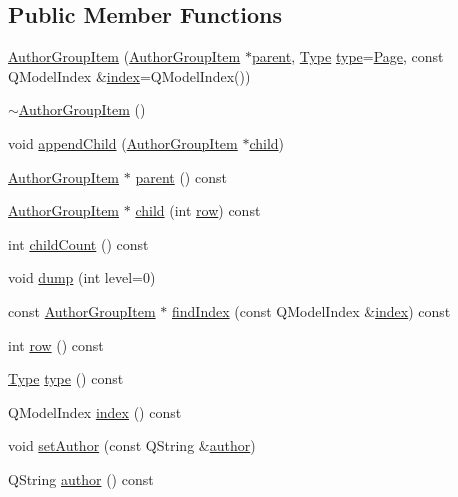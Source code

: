 \subsection*{Public Member Functions}
\begin{DoxyCompactItemize}
\item 
\hyperlink{classAuthorGroupItem_a7afc0fe975bde20274445cfe408adc64}{Author\+Group\+Item} (\hyperlink{classAuthorGroupItem}{Author\+Group\+Item} $\ast$\hyperlink{classAuthorGroupItem_a611ca0b8336c7a947380903fbdee71c6}{parent}, \hyperlink{classAuthorGroupItem_a81146eef0470ace44a96271cdc1172d5}{Type} \hyperlink{classAuthorGroupItem_a216b9845b38d50a5be8bb317bff914ad}{type}=\hyperlink{classAuthorGroupItem_a81146eef0470ace44a96271cdc1172d5ad8f8f4cff087cf79bc755aa05f6d4a4c}{Page}, const Q\+Model\+Index \&\hyperlink{classAuthorGroupItem_a65486be87b916d5901a0c45c667aa043}{index}=Q\+Model\+Index())
\item 
\hyperlink{classAuthorGroupItem_a29c6dfe191a80f724d40bb9a440c1568}{$\sim$\+Author\+Group\+Item} ()
\item 
void \hyperlink{classAuthorGroupItem_aca4ca1a589f7c509dc0a4935915721ce}{append\+Child} (\hyperlink{classAuthorGroupItem}{Author\+Group\+Item} $\ast$\hyperlink{classAuthorGroupItem_a409666687b87a8089a88fc98a46d97da}{child})
\item 
\hyperlink{classAuthorGroupItem}{Author\+Group\+Item} $\ast$ \hyperlink{classAuthorGroupItem_a611ca0b8336c7a947380903fbdee71c6}{parent} () const 
\item 
\hyperlink{classAuthorGroupItem}{Author\+Group\+Item} $\ast$ \hyperlink{classAuthorGroupItem_a409666687b87a8089a88fc98a46d97da}{child} (int \hyperlink{classAuthorGroupItem_aa307483dbbd9049c3af051ca90ebc207}{row}) const 
\item 
int \hyperlink{classAuthorGroupItem_a4036141af4b01024f390115c45f266a2}{child\+Count} () const 
\item 
void \hyperlink{classAuthorGroupItem_ad55c22edb38310704ece2465314abede}{dump} (int level=0)
\item 
const \hyperlink{classAuthorGroupItem}{Author\+Group\+Item} $\ast$ \hyperlink{classAuthorGroupItem_a0c6d7dd63e1210e0191788beab84f225}{find\+Index} (const Q\+Model\+Index \&\hyperlink{classAuthorGroupItem_a65486be87b916d5901a0c45c667aa043}{index}) const 
\item 
int \hyperlink{classAuthorGroupItem_aa307483dbbd9049c3af051ca90ebc207}{row} () const 
\item 
\hyperlink{classAuthorGroupItem_a81146eef0470ace44a96271cdc1172d5}{Type} \hyperlink{classAuthorGroupItem_a216b9845b38d50a5be8bb317bff914ad}{type} () const 
\item 
Q\+Model\+Index \hyperlink{classAuthorGroupItem_a65486be87b916d5901a0c45c667aa043}{index} () const 
\item 
void \hyperlink{classAuthorGroupItem_a8fb2971540c84d4ce3f2809f05c270c4}{set\+Author} (const Q\+String \&\hyperlink{classAuthorGroupItem_ad2caab42e0010017e575483464321a81}{author})
\item 
Q\+String \hyperlink{classAuthorGroupItem_ad2caab42e0010017e575483464321a81}{author} () const 
\end{DoxyCompactItemize}


